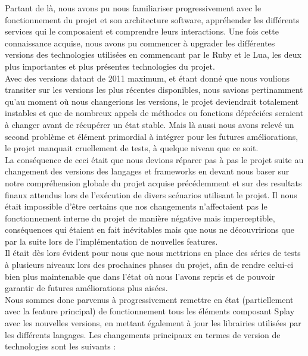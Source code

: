 \documentclass{eplmastersthesis}
\begin{document}
        Partant de là, nous avons pu nous familiariser progressivement avec
        le fonctionnement du projet et son architecture software, appréhender
        les différents services qui le composaient et comprendre leurs
        interactions. Une fois cette connaissance acquise, nous avons pu
        commencer à upgrader les différentes versions des technologies
        utilisées en commencant par le Ruby et le Lua, les deux plus importantes
        et plus présentes technologies du projet.\\
        Avec des versions datant de 2011 maximum, et étant donné que nous voulions
        transiter sur les versions les plus récentes disponibles, nous savions
        pertinamment qu'au moment où nous changerions les versions, le projet
        deviendrait totalement instables et que de nombreux appels de méthodes
        ou fonctions dépréciées seraient à changer avant de récupérer un état
        stable. Mais là aussi nous avons relevé un second problème et élément
        primordial à intégrer pour les futures améliorations, le projet
        manquait cruellement de tests, à quelque niveau que ce soit.\\

        La conséquence de ceci était que nous devions réparer pas à pas le
        projet suite au changement des versions des langages et frameworks en
        devant nous baser sur notre compréhension globale du projet acquise
        précédemment et sur des resultats finaux attendus lors de l'exécution
        de divers scénarios utilisant le projet. Il nous était impossible d'être
        certains que nos changements n'affectaient pas le fonctionnement interne
        du projet de manière négative mais imperceptible, conséquences qui
        étaient en fait inévitables mais que nous ne découvririons que par
        la suite lors de l'implémentation de nouvelles features.\\
        Il était dès lors évident pour nous que nous mettrions en place des
        séries de tests à plusieurs niveaux lors des prochaines phases du
        projet, afin de rendre celui-ci bien plus maintenable que dans l'état
        où nous l'avons repris et de pouvoir garantir de futures améliorations
        plus aisées.\\

        Nous sommes donc parvenus à progressivement remettre en état (partiellement avec la feature principal) de
        fonctionnement tous les éléments composant Splay avec les nouvelles
        versions, en mettant également à jour les librairies utilisées par
        les différents langages. Les changements principaux en termes de
        version de technologies sont les suivants :
\end{document}

